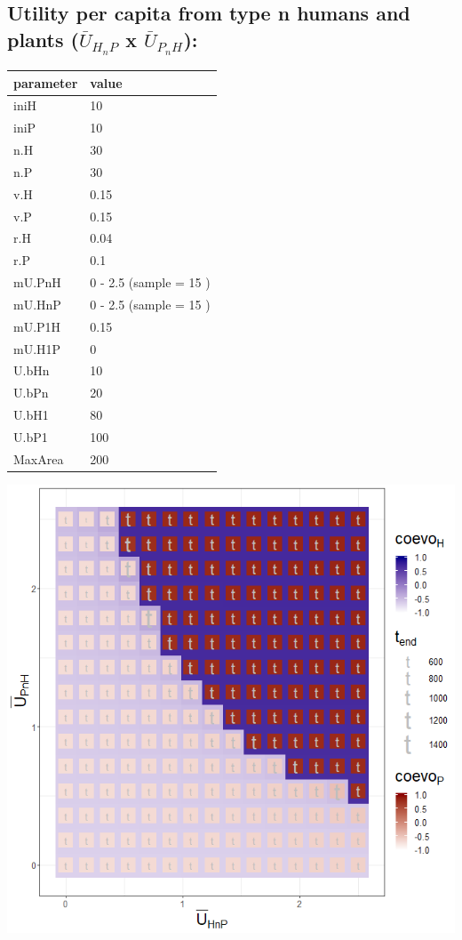 \documentclass[]{book}
\begin{document}
\hypertarget{utility-per-capita-from-type-n-humans-and-plants-baru_h_np-x-baru_p_nh}{%
\subsection{\texorpdfstring{Utility per capita from type n humans and plants (\(\bar{U}_{H_{n}P}\) x \(\bar{U}_{P_{n}H}\)):}{Utility per capita from type n humans and plants (\textbackslash{}bar\{U\}\_\{H\_\{n\}P\} x \textbackslash{}bar\{U\}\_\{P\_\{n\}H\}):}}\label{utility-per-capita-from-type-n-humans-and-plants-baru_h_np-x-baru_p_nh}}

\begin{tabular}{l|l}
\hline
parameter & value\\
\hline
iniH & 10\\
\hline
iniP & 10\\
\hline
n.H & 30\\
\hline
n.P & 30\\
\hline
v.H & 0.15\\
\hline
v.P & 0.15\\
\hline
r.H & 0.04\\
\hline
r.P & 0.1\\
\hline
mU.PnH & 0 - 2.5 (sample = 15 )\\
\hline
mU.HnP & 0 - 2.5 (sample = 15 )\\
\hline
mU.P1H & 0.15\\
\hline
mU.H1P & 0\\
\hline
U.bHn & 10\\
\hline
U.bPn & 20\\
\hline
U.bH1 & 80\\
\hline
U.bP1 & 100\\
\hline
MaxArea & 200\\
\hline
\end{tabular}

\newpage

\includegraphics[width=1\linewidth]{plots/3_twoPar-mU.HnP-mU.PnH_plot}
\end{document}
